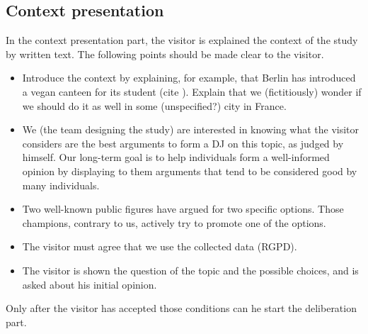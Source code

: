 \documentclass[version=3.21, pagesize, twoside=off, bibliography=totoc, DIV=calc, fontsize=12pt, a4paper]{scrartcl}
\begin{document}
\subsection{Context presentation}
In the context presentation part, the visitor is explained the context of the study by written text. The following points should be made clear to the visitor.
\begin{itemize}
	\item Introduce the context by explaining, for example, that Berlin has introduced a vegan canteen for its student (cite ). Explain that we (fictitiously) wonder if we should do it as well in some (unspecified?) city in France.
	\item We (the team designing the study) are interested in knowing what the visitor considers are the best arguments to form a \ac{DJ} on this topic, as judged by himself. Our long-term goal is to help individuals form a well-informed opinion by displaying to them arguments that tend to be considered good by many individuals.
	\item Two well-known public figures have argued for two specific options. Those champions, contrary to us, actively try to promote one of the options.
	\item The visitor must agree that we use the collected data (RGPD).
	\item The visitor is shown the question of the topic and the possible choices, and is asked about his initial opinion.
\end{itemize}
Only after the visitor has accepted those conditions can he start the deliberation part. 
\end{document}
